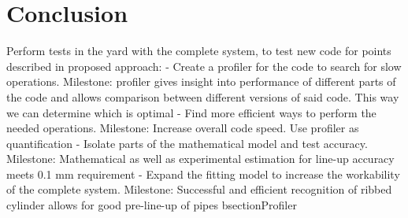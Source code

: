 \section{Conclusion}
\label{sec:conclusion}
Perform tests in the yard with the complete system, to test new code for points described in proposed approach:
- Create a profiler for the code to search for slow operations. Milestone: profiler gives insight into performance of different parts of the code and allows comparison between different versions of said code. This way we can determine which is optimal
- Find more efficient ways to perform the needed operations. Milestone: Increase overall code speed. Use profiler as quantification
- Isolate parts of the mathematical model and test accuracy. Milestone: Mathematical as well as experimental estimation for line-up accuracy meets 0.1 mm requirement
- Expand the fitting model to increase the workability of the complete system. Milestone: Successful and efficient recognition of ribbed cylinder allows for good pre-line-up of pipes
bsection{Profiler} \label{ssec:code_refactoring}

